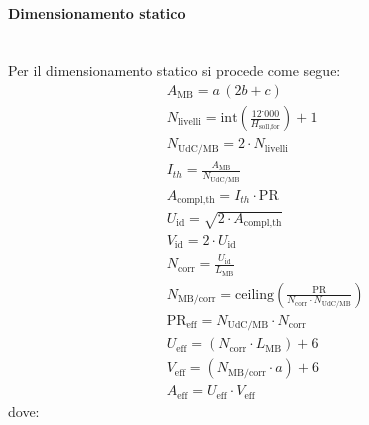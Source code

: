 \documentclass[11pt]{article}
\begin{document}
\paragraph{Dimensionamento statico}\mbox{}\\
Per il dimensionamento statico si procede come segue:
\begin{align}
    & A_\text{MB} = a\,(2b+c) \\
    & N_\text{livelli} = \text{int}\left(\frac{\text{12˙000}}{H_\text{soll,for}}\right)+1 \\
    & N_\text{UdC/MB} = 2 \cdot N_\text{livelli} \\
    & I_{th} = \frac{A_\text{MB}}{N_\text{UdC/MB}} \\
    & A_\text{compl,th} = I_{th} \cdot \text{PR} \\
    & U_\text{id} = \sqrt{2 \cdot A_\text{compl,th}} \\
    & V_\text{id} = 2\cdot U_\text{id} \\
    & N_\text{corr} = \frac{U_\text{id}}{L_\text{MB}} \\
    & N_\text{MB/corr} = \text{ceiling}\left(\frac{\text{PR}}{N_\text{corr} \cdot N_\text{UdC/MB}}\right) \\
    & \text{PR}_\text{eff} = N_\text{UdC/MB} \cdot N_\text{corr} \\
    & U_\text{eff} = (N_\text{corr} \cdot L_\text{MB}) + 6 \\
    & V_\text{eff} = (N_\text{MB/corr} \cdot a) + 6 \\
    & A_\text{eff} = U_\text{eff} \cdot V_\text{eff}
\end{align}
\noindent
dove:
\end{document}
